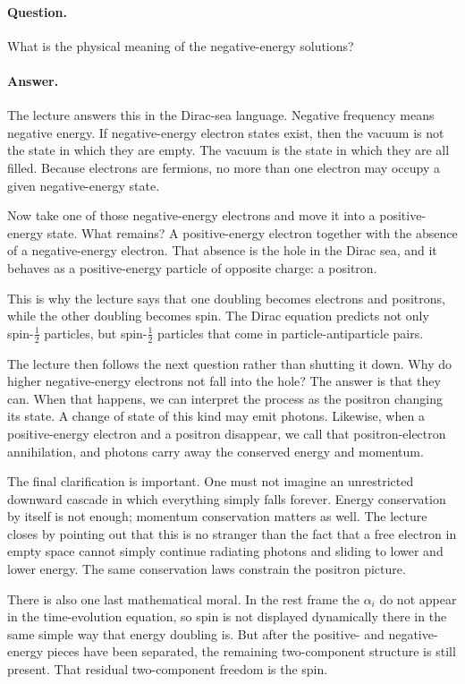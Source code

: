 \paragraph{Question.} What is the physical meaning of the negative-energy solutions?

\paragraph{Answer.} The lecture answers this in the Dirac-sea language. Negative frequency means negative energy. If negative-energy electron states exist, then the vacuum is not the state in which they are empty. The vacuum is the state in which they are all filled. Because electrons are fermions, no more than one electron may occupy a given negative-energy state.

Now take one of those negative-energy electrons and move it into a positive-energy state. What remains? A positive-energy electron together with the absence of a negative-energy electron. That absence is the hole in the Dirac sea, and it behaves as a positive-energy particle of opposite charge: a positron.

This is why the lecture says that one doubling becomes electrons and positrons, while the other doubling becomes spin. The Dirac equation predicts not only spin-\(\tfrac12\) particles, but spin-\(\tfrac12\) particles that come in particle-antiparticle pairs.

The lecture then follows the next question rather than shutting it down. Why do higher negative-energy electrons not fall into the hole? The answer is that they can. When that happens, we can interpret the process as the positron changing its state. A change of state of this kind may emit photons. Likewise, when a positive-energy electron and a positron disappear, we call that positron-electron annihilation, and photons carry away the conserved energy and momentum.

The final clarification is important. One must not imagine an unrestricted downward cascade in which everything simply falls forever. Energy conservation by itself is not enough; momentum conservation matters as well. The lecture closes by pointing out that this is no stranger than the fact that a free electron in empty space cannot simply continue radiating photons and sliding to lower and lower energy. The same conservation laws constrain the positron picture.

There is also one last mathematical moral. In the rest frame the \(\alpha_i\) do not appear in the time-evolution equation, so spin is not displayed dynamically there in the same simple way that energy doubling is. But after the positive- and negative-energy pieces have been separated, the remaining two-component structure is still present. That residual two-component freedom is the spin.


